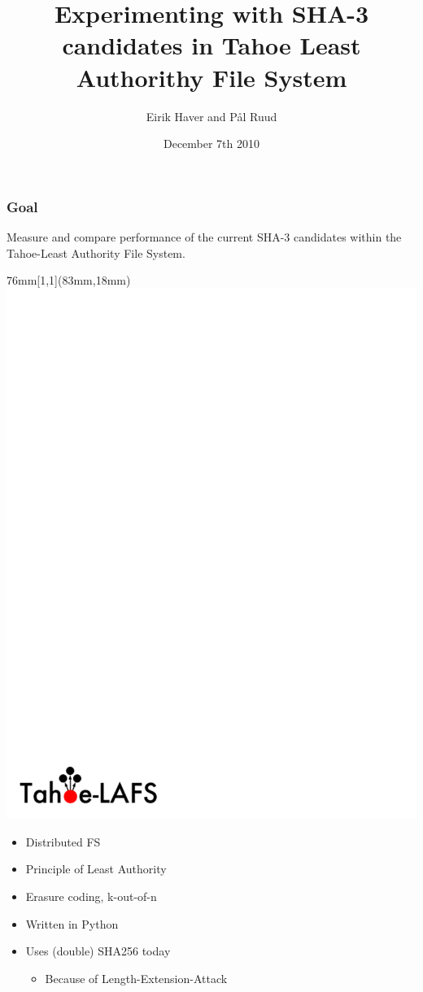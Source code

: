 \documentclass[screen]{beamer}
\title[SHA-3 in Tahoe-LAFS]%
{Experimenting with SHA-3 candidates in Tahoe Least Authorithy File System}
\author[EH \& PR]{Eirik Haver and Pål Ruud}
\institute[NTNU]{Department of Telematics}
\date{December 7th 2010}
\begin{document}
\ntnutitlepage

\begin{frame}
  \frametitle{Goal}

  Measure and compare performance of the current SHA-3 candidates within the
  Tahoe-Least Authority File System.

\end{frame}

\begin{frame}
  \begin{textblock*}{76mm}[1,1](83mm,18mm)
  \includegraphics[scale=0.4]{tahoe-logo.pdf}
  \end{textblock*}

  \begin{itemize}
  \item Distributed FS
  \item Principle of Least Authority
  \item Erasure coding, k-out-of-n
  \item Written in Python
  \item Uses (double) SHA256 today
    \begin{itemize}
        \item Because of Length-Extension-Attack
    \end{itemize}
  \end{itemize}
\end{frame}
\end{document}
